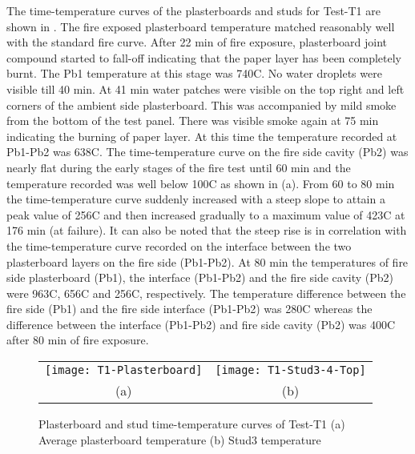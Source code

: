 The time-temperature curves of the plasterboards and studs for Test-T1 are shown in . The fire exposed plasterboard temperature matched reasonably well with the standard fire curve. After 22 min of fire exposure, plasterboard joint compound started to fall-off indicating that the paper layer has been completely burnt. The Pb1 temperature at this stage was 740\degree C. No water droplets were visible till 40 min. At 41 min water patches were visible on the top right and left corners of the ambient side plasterboard. This was accompanied by mild smoke from the bottom of the test panel. There was visible smoke again at 75 min indicating the burning of paper layer. At this time the temperature recorded at Pb1-Pb2 was 638\degree C. The time-temperature curve on the fire side cavity (Pb2) was nearly flat during the early stages of the fire test until 60 min and the temperature recorded was well below 100\degree C as shown in  (a). From 60 to 80 min the time-temperature curve suddenly increased with a steep slope to attain a peak value of 256\degree C and then increased gradually to a maximum value of 423\degree C at 176 min (at failure). It can also be noted that the steep rise is in correlation with the time-temperature curve recorded on the interface between the two plasterboard layers on the fire side (Pb1-Pb2). At 80 min the temperatures of fire side plasterboard (Pb1), the interface (Pb1-Pb2) and the fire side cavity (Pb2) were 963\degree C, 656\degree C and 256\degree C, respectively. The temperature difference between the fire side (Pb1) and the fire side interface (Pb1-Pb2) was 280\degree C whereas the difference between the interface (Pb1-Pb2) and fire side cavity (Pb2) was 400\degree C after 80 min of fire exposure. 
\begin{figure}[!htbp]
	\centering
		\begin{tabular}{cc}
			\texttt{[image: T1-Plasterboard]} & \texttt{[image: T1-Stud3-4-Top]} \\ 
			(a) & (b)  \\ 
		\end{tabular} 
		\caption{Plasterboard and stud time-temperature curves of Test-T1 (a) Average plasterboard temperature (b) Stud3 temperature}
		\label{fig:T1-PB-Stud}
\end{figure}

